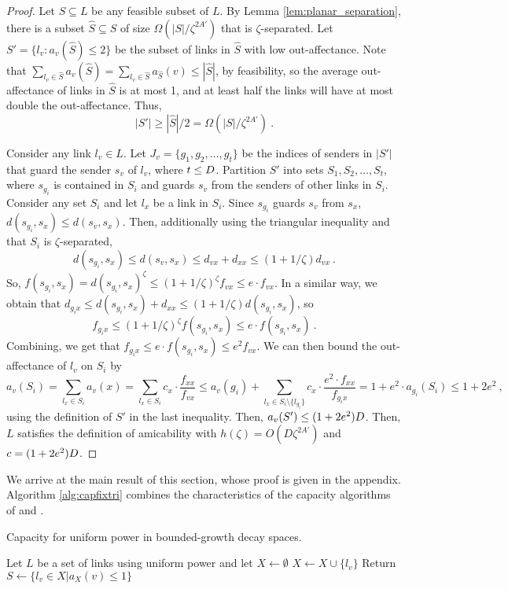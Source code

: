 \documentclass[11pt]{amsart}
\begin{document}
\begin{proof}
Let $S \subseteq L$ be any feasible subset of $L$.
By Lemma \ref{lem:planar_separation}, there is a subset
$\hat{S} \subseteq S$ of size $\Omega(|S|/\zeta^{2A'})$ that is 
$\zeta$-separated.
Let $S' = \{l_v : a_v(\hat{S}) \le 2 \}$ be the subset of links in
$\hat{S}$ with low out-affectance.
Note that $\sum_{l_v \in \hat{S}} a_v(\hat{S}) = 
\sum_{l_v \in \hat{S}} a_{\hat{S}}(v) \le |\hat{S}|$, by feasibility,
so the average
out-affectance of links in $\hat{S}$ is at most 1, and at least half
the links will have at most double the out-affectance.
Thus, 
\[ |S'| \ge |\hat{S}|/2 = \Omega(|S|/\zeta^{2A'})\ . \]


Consider any link $l_v \in L$.  Let $J_v = \{g_1, g_2, \ldots, g_t\} $
be the indices of senders in $|S'|$ that guard the sender $s_v$ of
$l_v$, where $t \le D$. Partition $S'$ into sets 
$S_1, S_2, \ldots, S_t$, where $s_{g_i}$ is contained in $S_i$ and guards
$s_v$ from the senders of other links in $S_i$.
Consider any set $S_i$ and let $l_x$ be a link in $S_i$.
Since $s_{g_i}$ guards $s_v$ from $s_x$, $d(s_{g_i},s_x) \le d(s_v, s_x)$.
Then, additionally using the triangular inequality and that $S_i$ is $\zeta$-separated,
\[ d(s_{g_i},s_x) \le d(s_v,s_x) \le d_{vx} + d_{xx} \le (1 + 1/\zeta)d_{vx}\ . \]
So, 
$f(s_{g_i},s_x) = d(s_{g_i},s_x)^\zeta 
  \le (1 + 1/\zeta)^\zeta f_{vx}  \le e \cdot f_{vx}$.
In a similar way, we obtain that
  $d_{g_i x} \le d(s_{g_i},s_x)  + d_{xx} \le (1 + 1/\zeta)d(s_{g_i},s_x)$,
so 
 \[ f_{g_i x} \le (1 + 1/\zeta)^\zeta f(s_{g_i},s_x) \le e \cdot f(s_{g_i},s_x)\ . \]
Combining, we get that 
$f_{g_i x} \le e \cdot f(s_{g_i},s_x) \le e^2 f_{v x}$.
We can then bound the out-affectance of $l_v$ on $S_i$ by
\[ a_v(S_i) = \sum_{l_x \in S_i} a_v(x)
  = \sum_{l_x \in S_i} c_x \cdot \frac{f_{xx}}{f_{vx}}
  \le a_v(g_i) 
    + \sum_{l_x \in S_i \setminus\{l_{g_i}\}} c_x \cdot \frac{e^2 \cdot f_{xx}}{f_{g_i x}}
  = 1 + e^2 \cdot a_{g_i}(S_i) \le 1 + 2e^2\ , \]
using the definition of $S'$ in the last inequality.
Then, $a_v(S') \le (1+2e^2) D$.
Then, $L$ satisfies the definition of amicability with $h(\zeta) =
O(D \zeta^{2A'})$ and $c = (1+2e^2) D$.
\end{proof}

We arrive at the main result of this section, whose proof is given in the appendix. Algorithm \ref{alg:capfixtri} combines the characteristics of the capacity algorithms of \cite{GHWW09} and \cite{SODA11}.


\begin{algorithm}[h]
\caption{Capacity for uniform power in bounded-growth decay spaces.}\label{alg:capfixtri}
\begin{algorithmic}
\STATE Let $L$ be a set of links using uniform power and let $X \leftarrow \emptyset$
 \label{alg:tri1/2}
\STATE $X \leftarrow X \cup \{l_v\}$
\ENDIF
\ENDFOR
\STATE Return $S \leftarrow \{l_v \in X| a_X(v) \leq 1\}$
\end{algorithmic}
\end{algorithm}
\end{document}
